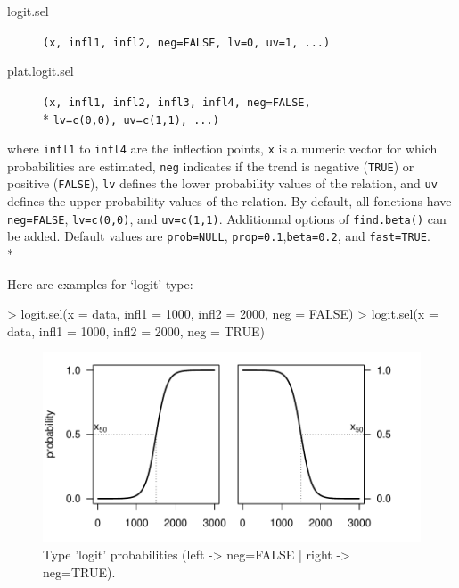 \documentclass[letterpaper, 12pt]{article}
\begin{document}
\begin{description}
\item[logit.sel]\verb#(x, infl1, infl2, neg=FALSE, lv=0, uv=1, ...)#
\item[plat.logit.sel]\verb#(x, infl1, infl2, infl3, infl4, neg=FALSE,# \\* \verb#lv=c(0,0), uv=c(1,1), ...)#
\end{description}
where \verb#infl1# to \verb#infl4# are the inflection points, \verb#x# is a numeric vector for which probabilities are 
estimated, \verb#neg# indicates if the trend is negative  (\verb#TRUE#) or positive (\verb#FALSE#), \verb#lv# defines the 
lower probability values of the relation, and \verb#uv# defines the upper probability values of the relation. By default, 
all fonctions have \verb#neg=FALSE#, \verb#lv=c(0,0)#, and \verb#uv=c(1,1)#. Additionnal options of \verb#find.beta()# 
can be added. Default values are \verb#prob=NULL#, \verb#prop=0.1#,\verb#beta=0.2#, and \verb#fast=TRUE#.  \\*

Here are examples for `logit' type:
\begin{Schunk}
\begin{Sinput}
> logit.sel(x = data, infl1 = 1000, infl2 = 2000, neg = FALSE)
> logit.sel(x = data, infl1 = 1000, infl2 = 2000, neg = TRUE)
\end{Sinput}
\end{Schunk}
\begin{figure}[h]
\vspace{-20pt}
\begin{center}
\includegraphics{relation_sel-025}
\end{center}
\vspace{-30pt}
\caption{Type 'logit' probabilities (left -> neg=FALSE |  right -> neg=TRUE).}
\vspace{-10pt}
\label{fig12}
\end{figure}
\end{document}
